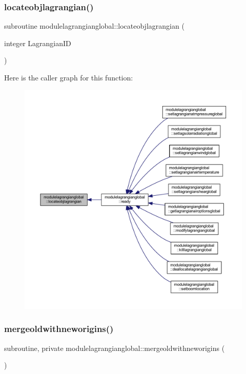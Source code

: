 \subsubsection{\texorpdfstring{locateobjlagrangian()}{locateobjlagrangian()}}
{\footnotesize\ttfamily subroutine modulelagrangianglobal\+::locateobjlagrangian (\begin{DoxyParamCaption}\item[{integer}]{Lagrangian\+ID }\end{DoxyParamCaption})\hspace{0.3cm}{\ttfamily [private]}}

Here is the caller graph for this function\+:\nopagebreak
\begin{figure}[H]
\begin{center}
\leavevmode
\includegraphics[width=350pt]{namespacemodulelagrangianglobal_adde8d4f2aa77a7a09dbd30d7200dcc6d_icgraph}
\end{center}
\end{figure}
\mbox{\label{namespacemodulelagrangianglobal_a615ab3a1eadb5c6d09f9fe8642d2c59f}} 
\subsubsection{\texorpdfstring{mergeoldwithneworigins()}{mergeoldwithneworigins()}}
{\footnotesize\ttfamily subroutine, private modulelagrangianglobal\+::mergeoldwithneworigins (\begin{DoxyParamCaption}{ }\end{DoxyParamCaption})\hspace{0.3cm}{\ttfamily [private]}}

